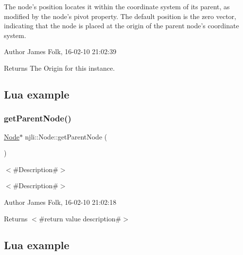 The node’s position locates it within the coordinate system of its parent, as modified by the node’s pivot property. The default position is the zero vector, indicating that the node is placed at the origin of the parent node’s coordinate system. 

\begin{DoxyAuthor}{Author}
James Folk, 16-\/02-\/10 21\+:02\+:39
\end{DoxyAuthor}
\begin{DoxyReturn}{Returns}
The Origin for this instance.
\end{DoxyReturn}
\hypertarget{classnjli_1_1_steering_behavior_wander_ex1}{}\subsection{Lua example}\label{classnjli_1_1_steering_behavior_wander_ex1}

\begin{DoxyCodeInclude}
\end{DoxyCodeInclude}
\mbox{\label{classnjli_1_1_node_a65ab991b8728c265d6d68d870450c1f3}} 
\subsubsection{\texorpdfstring{get\+Parent\+Node()}{getParentNode()}\hspace{0.1cm}{\footnotesize\ttfamily [1/2]}}
{\footnotesize\ttfamily \mbox{\hyperlink{classnjli_1_1_node}{Node}}$\ast$ njli\+::\+Node\+::get\+Parent\+Node (\begin{DoxyParamCaption}{ }\end{DoxyParamCaption})}



$<$\#\+Description\#$>$ 

$<$\#\+Description\#$>$ \begin{DoxyAuthor}{Author}
James Folk, 16-\/02-\/10 21\+:02\+:18
\end{DoxyAuthor}
\begin{DoxyReturn}{Returns}
$<$\#return value description\#$>$
\end{DoxyReturn}
\hypertarget{classnjli_1_1_steering_behavior_wander_ex1}{}\subsection{Lua example}\label{classnjli_1_1_steering_behavior_wander_ex1}

